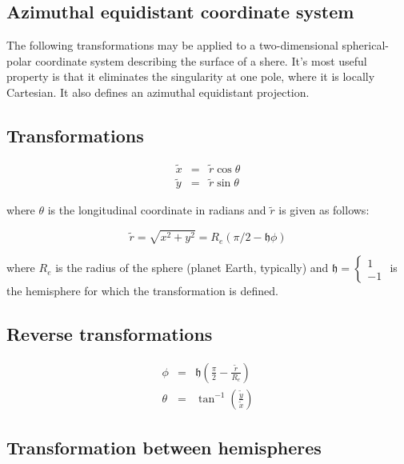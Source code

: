 \documentclass[12pt]{report}
\begin{document}
\begin{flushleft}
\section{Azimuthal equidistant coordinate system}

The following transformations may be applied to a two-dimensional spherical-
polar coordinate system describing the surface of a shere.  
It's most useful property is that it eliminates the singularity at one pole, where
it is locally Cartesian.  It also defines an azimuthal equidistant projection.

\subsection{Transformations}

\begin{eqnarray}
\tilde x & = & \tilde r \cos \theta \\
\tilde y & = & \tilde r \sin \theta
\end{eqnarray}

where $\theta$ is the longitudinal coordinate in radians and $\tilde r$
 is given as follows:
 
\begin{equation}
\tilde r = \sqrt{x^2 + y^2} = R_e (\pi/2 - \mathfrak h \phi)
\end{equation}

where $R_e$ is the radius of the sphere (planet Earth, typically) and 
$\mathfrak h = \left \lbrace \begin{array}{r} 1 \\ -1 \end{array} \right.$
is the hemisphere for which the transformation is defined.

\subsection{Reverse transformations}

\begin{eqnarray}
\phi & = & \mathfrak h \left ( \frac{\pi}{2} - \frac{\tilde r}{R_e} \right ) \\
\theta & = & \tan^{-1} \left (\frac{\tilde y}{\tilde x} \right )
\end{eqnarray}

\subsection{Transformation between hemispheres}


\end{flushleft}
\end{document}

